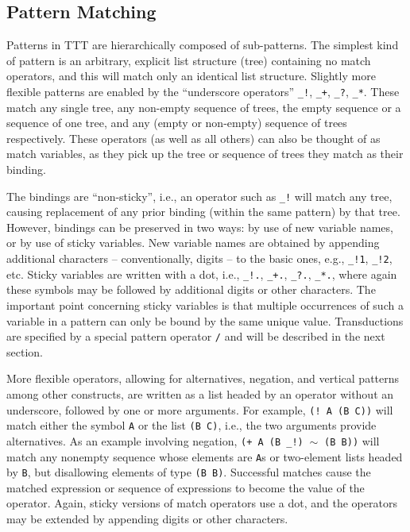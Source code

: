 \documentclass[a4,11pt]{article}
\begin{document}
\subsection*{Pattern Matching}
Patterns in TTT are hierarchically composed of sub-patterns. The simplest kind of pattern is an arbitrary, explicit list structure (tree) containing no match operators, and this will match only an identical list structure. Slightly more flexible patterns are enabled by the ``underscore operators'' \texttt{\_!}, \texttt{\_+}, \texttt{\_?}, \texttt{\_*}.  These match any single tree, any non-empty sequence of trees, the empty sequence or a sequence of one tree, and any (empty or non-empty) sequence of trees respectively. These operators (as well as all others) can also be thought of as match variables, as they pick up the tree or sequence of trees they match as their binding. 

The bindings are ``non-sticky'', i.e., an operator such as \texttt{\_!} will match any tree, causing replacement of any prior binding (within the same pattern) by that tree. However, bindings can be preserved in two ways: by use of new variable names, or by use of sticky variables. New variable names are obtained by appending additional characters -- conventionally, digits -- to the basic ones, e.g., \texttt{\_!1}, \texttt{\_!2}, etc. Sticky variables are written with a dot, i.e., \texttt{\_!.}, \texttt{\_+.}, \texttt{\_?.}, \texttt{\_*.}, where again these symbols may be followed by additional digits or other characters. The important point concerning sticky variables is that multiple occurrences of such a variable in a pattern can only be bound by the same unique value. Transductions are specified by a special pattern operator \texttt{/} and will be described in the next section.

More flexible operators, allowing for alternatives, negation, and vertical patterns among other constructs, are written as a list headed by an operator without an underscore, followed by one or more arguments. For example, \texttt{(!~A (B C))} will match either the symbol \texttt{A} or the list \texttt{(B C)}, i.e., the two arguments provide alternatives. As an example involving negation, \texttt{(+ A (B \_!)$\;\sim\;$(B B))} will match any nonempty sequence whose elements are \texttt{A}s or two-element lists headed by \texttt{B}, but disallowing elements of type \texttt{(B B)}. Successful matches cause the matched expression or sequence of expressions to become the value of the operator. Again, sticky versions of match operators use a dot, and the operators may be extended by appending digits or other characters. 
\end{document}
